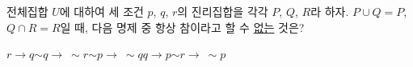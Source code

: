 전체집합 $U$에 대하여 세 조건 $p$, $q$, $r$의 진리집합을 각각 $P$, $Q$, $R$라 하자. $P\cup Q=P$, $Q\cap R=R$일 때, 다음 명제 중 항상 참이라고 할 수 \underline{없는} 것은?
\begin{choices32}{$r\longrightarrow q$}{$\sim q\longrightarrow\ \sim r$}{$\sim p\longrightarrow\ \sim q$}{$q\longrightarrow p$}{$\sim r\longrightarrow\ \sim p$}\end{choices32}

